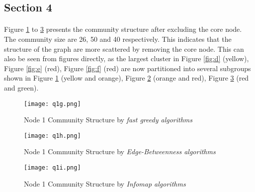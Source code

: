 \subsection*{Section 4}
\paragraph{}
Figure \ref{fig:g} to \ref{fig:i} presents the community structure after excluding the core node. The community size are 26, 50 and 40 respectively. This indicates that the structure of the graph are more scattered by removing the core node. This can also be seen from figures directly, as the largest cluster in Figure \ref{fig:d} (yellow), Figure \ref{fig:e} (red), Figure \ref{fig:f} (red) are now partitioned into several subgroups shown in Figure \ref{fig:g} (yellow and orange), Figure \ref{fig:h} (orange and red), Figure \ref{fig:i} (red and green).


\begin{figure}[h!]
	\centering
	\texttt{[image: q1g.png]}
	\caption{Node 1 Community Structure by \textit{fast greedy algorithms}}	
	\label{fig:g}
\end{figure}
\begin{figure}[h!]
	\centering
	\texttt{[image: q1h.png]}
	\caption{Node 1 Community Structure by \textit{Edge-Betweenness algorithms}}	
	\label{fig:h}
\end{figure}

\begin{figure}[h!]
	\centering
	\texttt{[image: q1i.png]}
	\caption{Node 1 Community Structure by \textit{Infomap algorithms}}	
	\label{fig:i}
\end{figure}